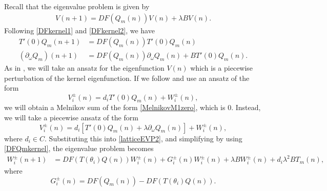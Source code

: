\documentclass[12pt]{elsarticle}
\begin{document}
Recall that the eigenvalue problem is given by 
\begin{align}\label{latticeEVP2}
V(n+1) = DF(Q_m(n)) V(n) + \lambda B V(n).
\end{align}
Following \cref{DFkernel1} and \cref{DFkernel2}, we have 
\begin{equation}\label{DFQmkernel}
\begin{aligned}
T'(0)Q_m(n+1) &= DF(Q_m(n))T'(0)Q_m(n) \\
(\partial_\omega Q_m)(n+1) &= DF(Q_m(n))\partial_\omega Q_m(n) + B T'(0)Q_m(n).
\end{aligned}
\end{equation}
As in \cite{Sandstede1998}, we will take an ansatz for the eigenfunction $V(n)$ which is a piecewise perturbation of the kernel eigenfunction. If we follow \cite{Sandstede1998} and 
use an ansatz of the form 
\begin{equation*}
V_i^\pm(n) = 
d_i T'(0)Q_m(n) + W_i^\pm(n),
\end{equation*}
we will obtain a Melnikov sum of the form \cref{MelnikovM1zero}, which is 0. Instead, we will take a piecewise ansatz of the form
\begin{equation}\label{Viansatz2}
V_i^\pm(n) = 
d_i [ T'(0)Q_m(n) + \lambda \partial_\omega Q_m(n) ] + W_i^\pm(n),
\end{equation}
where $d_i \in C$. Substituting this into \cref{latticeEVP2}, and simplifying by using \cref{DFQmkernel}, the eigenvalue problem becomes
\begin{align}\label{Weq1}
W_i^\pm(n+1)
&= DF(T(\theta_i) Q(n) ) W_i^\pm(n) + G_i^\pm(n)W_i^\pm(n) + \lambda B W_i^\pm(n) + d_i \lambda^2 B T_m(n),
\end{align}
where
\begin{equation}
G_i^\pm(n) = DF(Q_m(n)) - DF(T(\theta_i) Q(n) ).
\end{equation}
\end{document}
